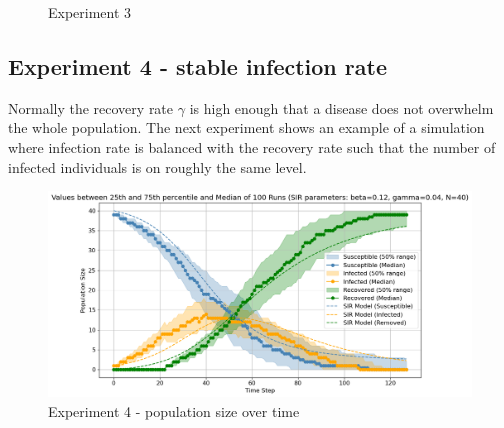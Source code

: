 \begin{figure}[H]
    \centering
    \hspace*{\fill}
    \hspace*{\fill}

    \caption{Experiment 3} \label{fig:experiment2}
\end{figure}

\subsection{Experiment 4 - stable infection rate}

Normally the recovery rate $\gamma$ is high enough that a disease does not overwhelm the whole population.
The next experiment shows an example of a simulation where infection rate is balanced with the recovery rate such that the number of infected individuals is on roughly the same level.


\begin{figure}[H]
    \centering
    \includegraphics[width=1.0\textwidth]{images/chapter2/experiment3.png}
    \caption{Experiment 4 - population size over time}\label{fig:images/chapter2/experiment3.png}
\end{figure}

